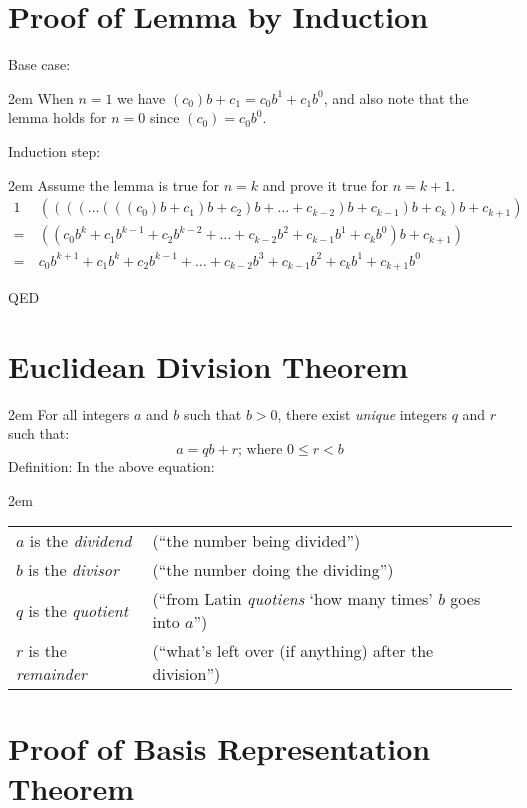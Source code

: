 \documentclass{article}
\newenvironment{jprIn}{\begin{adjustwidth}{2em}{}}{\end{adjustwidth}}
\begin{document}
\section*{Proof of Lemma by Induction}
Base case:
\begin{jprIn}
When \(n=1\) we have \((c_0)b + c_1 = c_0b^1 + c_1b^0\), and
also note that the lemma holds for \(n=0\) since \((c_0) = c_0b^0\).
\end{jprIn}
Induction step:
\begin{jprIn}
Assume the lemma is true for \(n=k\) and prove it true for \(n=k+1\).
{\small
\begin{alignat*}{1}
&((((\dots{}(((c_0)b + c_1)b + c_2)b + \dots{} + c_{k-2})b + c_{k-1})b + c_k)b + c_{k+1})\\
=\  &((c_0b^k + c_1b^{k-1} + c_2b^{k-2} + \dots{} + c_{k-2}b^2 + c_{k-1}b^1 + c_{k}b^0)b + c_{k+1})\\
=\  &c_0b^{k+1} + c_1b^{k} + c_2b^{k-1} + \dots{} + c_{k-2}b^3 + c_{k-1}b^2 + c_{k}b^1 + c_{k+1}b^0
\end{alignat*}
}
\end{jprIn}
\hspace*{\fill}QED

\section*{Euclidean Division Theorem}
\begin{jprIn}
For all integers \(a\) and \(b\) such that \(b>0\),
there exist \emph{unique} integers \(q\) and \(r\) such that:
\[a=qb+r  \text{; where } 0\le{}r<b\]
Definition: In the above equation:
\begin{jprIn}
\begin{tabular}{l l}
\(a\) is the \emph{dividend} & (``the number being divided'')\\
\(b\) is the \emph{divisor} & (``the number doing the dividing'')\\
\(q\) is the \emph{quotient} & (``from Latin \emph{quotiens} `how many times' \(b\) goes into \(a\)'')\\
\(r\) is the \emph{remainder} & (``what's left over (if anything) after the division'')
\end{tabular}
\end{jprIn}
\end{jprIn}

\section*{Proof of Basis Representation Theorem}
\end{document}
